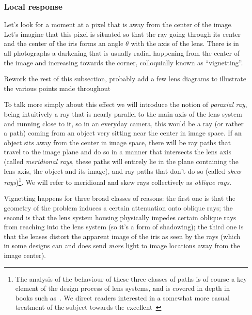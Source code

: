\subsubsection{Local response}
Let's look for a moment at a pixel that is away from the center of the image.
Let's imagine that this pixel is situated so that the ray going through its center
and the center of the iris forms an angle $\theta$ with the axis of the lens.
There is in all photographs a darkening that is usually radial happening from the
center of the image and increasing towards the corner, colloquially known as ``vignetting''.

\begin{inconstruction}
	Rework the rest of this subsection, probably add a few lens diagrams to illustrate the various points made throughout
\end{inconstruction}

To talk more simply about this effect we will introduce the notion of \textsl{\gls{paraxial ray}},
being intuitively a ray that is nearly parallel to the main axis of the lens system and running 
close to it, so in an everyday camera, this would be a ray (or rather a path) coming from an 
object very sitting near the center in image space. 
If an object sits away from the center in image space, there will be ray paths that travel to the 
image plane and do so in a manner that intersects the lens axis (called \textsl{meridional rays}, 
these paths will entirely lie in the plane containing the lens axis, the object and its image),
and ray paths that don't do so (called \textsl{skew rays})\footnote{ 
	The analysis of the behaviour of these three classes of paths is of course a key element of 
	the design process of lens systems, and is covered in depth in books such 	
	as~\cite{kingslake2010,smith2008}. We direct readers interested in a somewhat more
	casual treatment of the subject towards the excellent~\cite{kingslake92}}.
We will refer to meridional and skew rays collectively as \textsl{\glspl{oblique ray}}.

Vignetting happens for three broad classes of reasons: 
	the first one is that the geometry of the problem induces a certain attenuation onto \glspl{oblique ray}; 
	the second is that the lens system housing physically impedes certain \glspl{oblique ray} from 
	reaching into the lens system (so it's a form of shadowing);
	the third one is that the lenses distort the apparent image of the \gls{iris} as seen by the
	rays (which in some designs can and does send \emph{more} light to image locations away from the
	image center).

